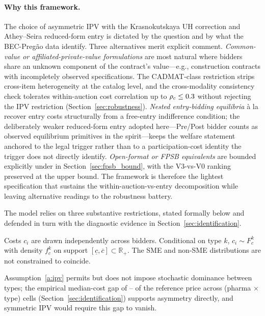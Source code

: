 \paragraph{Why this framework.} The choice of asymmetric IPV with the Krasnokutskaya UH correction and Athey--Seira reduced-form entry is dictated by the question and by what the BEC-Preg\~ao data identify. Three alternatives merit explicit comment. \emph{Common-value or affiliated-private-value formulations} \citep{milgrom1982, hong2003} are most natural where bidders share an unknown component of the contract's value---e.g., construction contracts with incompletely observed specifications. The CADMAT-class restriction strips cross-item heterogeneity at the catalog level, and the cross-modality consistency check tolerates within-auction cost correlation up to $\rho_c \le 0.3$ without rejecting the IPV restriction (Section~\ref{sec:robustness}). \emph{Nested entry-bidding equilibria} \`a la \citet{krasnokutskayaseim2011} recover entry costs structurally from a free-entry indifference condition; the deliberately weaker reduced-form entry adopted here---Pre/Post bidder counts as observed equilibrium primitives in the \citet{atheyseira2011} spirit---keeps the welfare statement anchored to the legal trigger rather than to a participation-cost identity the trigger does not directly identify. \emph{Open-format or FPSB equivalents} are bounded explicitly under \citet{maskinriley2000} in Section~\ref{sec:fpsb_bound}, with the V3-vs-V0 ranking preserved at the upper bound. The framework is therefore the lightest specification that sustains the within-auction-vs-entry decomposition while leaving alternative readings to the robustness battery.

The model relies on three substantive restrictions, stated formally below and defended in turn with the diagnostic evidence in Section~\ref{sec:identification}.

\begin{assumption}\label{a:ipv}
Costs $c_i$ are drawn independently across bidders. Conditional on type $k$, $c_i \sim F_c^k$ with density $f_c^k$ on support $[\underline{c}, \overline{c}] \subset \mathbb{R}_+$. The SME and non-SME distributions are not constrained to coincide.
\end{assumption}

Assumption~\ref{a:ipv} permits but does not impose stochastic dominance between types; the empirical median-cost gap of \medCostGapLo--\medCostGapHi{} of the reference price across (pharma $\times$ type) cells (Section~\ref{sec:identification}) supports asymmetry directly, and symmetric IPV would require this gap to vanish.


